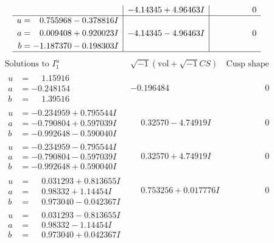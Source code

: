 \documentclass[1p]{elsarticle_modified}
\theoremstyle{definition}
\newcommand{\I}{\sqrt{-1}}
\begin{document}
$$\begin{array}{c|c|c}
 & -4.14345 + 4.96463 I & \phantom{-0.000000 } 0 \\ \hline\begin{aligned}
u &= \phantom{-}0.755968 - 0.378816 I \\
a &= \phantom{-}0.009408 + 0.920023 I \\
b &= -1.187370 - 0.198303 I\end{aligned}
 & -4.14345 - 4.96463 I & \phantom{-0.000000 } 0\\
 \hline 
 \end{array}$$\newpage$$\begin{array}{c|c|c}  
\text{Solutions to }I^u_{1}& \I (\text{vol} + \sqrt{-1}CS) & \text{Cusp shape}\\
 \hline 
\begin{aligned}
u &= \phantom{-}1.15916\phantom{ +0.000000I} \\
a &= -0.248154\phantom{ +0.000000I} \\
b &= \phantom{-}1.39516\phantom{ +0.000000I}\end{aligned}
 & -0.196484\phantom{ +0.000000I} & \phantom{-0.000000 } 0 \\ \hline\begin{aligned}
u &= -0.234959 + 0.795544 I \\
a &= -0.790804 + 0.597039 I \\
b &= -0.992648 - 0.590040 I\end{aligned}
 & \phantom{-}0.32570 - 4.74919 I & \phantom{-0.000000 } 0 \\ \hline\begin{aligned}
u &= -0.234959 - 0.795544 I \\
a &= -0.790804 - 0.597039 I \\
b &= -0.992648 + 0.590040 I\end{aligned}
 & \phantom{-}0.32570 + 4.74919 I & \phantom{-0.000000 } 0 \\ \hline\begin{aligned}
u &= \phantom{-}0.031293 + 0.813655 I \\
a &= \phantom{-}0.98332 + 1.14454 I \\
b &= \phantom{-}0.973040 - 0.042367 I\end{aligned}
 & \phantom{-}0.753256 + 0.017776 I & \phantom{-0.000000 } 0 \\ \hline\begin{aligned}
u &= \phantom{-}0.031293 - 0.813655 I \\
a &= \phantom{-}0.98332 - 1.14454 I \\
b &= \phantom{-}0.973040 + 0.042367 I\end{aligned}

\end{array}$$
\end{document}
